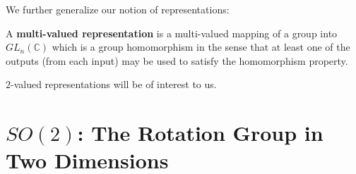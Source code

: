\documentclass[compress,aspectratio=169,10pt,usenames,dvipsnames]{beamer}
\newcommand{\C}{\mathbb{C}}
\begin{document}
\begin{frame}
\vfill
We further generalize our notion of representations:
\vfill
\begin{definition}
	A \textbf{multi-valued representation} is a multi-valued mapping of a group into $GL_n(\C)$ which is a group homomorphism in the sense that at least one of the outputs (from each input) may be used to satisfy the homomorphism property.
\end{definition}
\vfill
$2$-valued representations will be of interest to us.
\vfill
\end{frame}
%
%
\section{$SO(2)$: The Rotation Group in Two Dimensions}

\begin{frame}
	\sectionpage
\end{frame}
\end{document}

